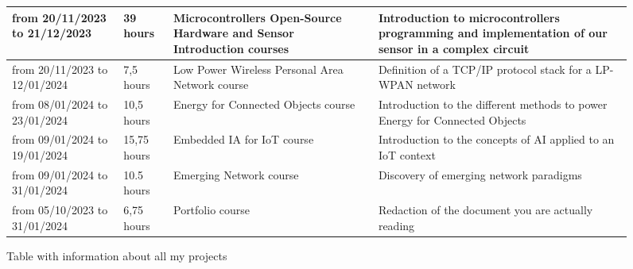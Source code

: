\newpage

\begin{figure}[hp]
    \centering
    \begin{tabular}{|C{2.25cm}|C{2.25cm}|L{5cm}|L{5cm}|}
        \hline
        from 20/11/2023 to 21/12/2023 & 39 hours & Microcontrollers Open-Source Hardware and Sensor Introduction courses & Introduction to microcontrollers programming and implementation of our sensor in a complex circuit \\
        \hline
        from 20/11/2023 to 12/01/2024 & 7,5 hours & Low Power Wireless Personal Area Network course & Definition of a TCP/IP protocol stack for a LP-WPAN network \\
        \hline
        from 08/01/2024 to 23/01/2024 & 10,5 hours & Energy for Connected Objects course & Introduction to the different methods to power Energy for Connected Objects \\
        \hline
        from 09/01/2024 to 19/01/2024 & 15,75 hours & Embedded IA for IoT course & Introduction to the concepts of AI applied to an IoT context \\
        \hline
        from 09/01/2024 to 31/01/2024 & 10.5 hours & Emerging Network course & Discovery of emerging network paradigms \\
        \hline
        from 05/10/2023 to 31/01/2024 & 6,75 hours & Portfolio course & Redaction of the document you are actually reading \\
        \hline
    \end{tabular}
    \caption{Table with information about all my projects}
\end{figure}



